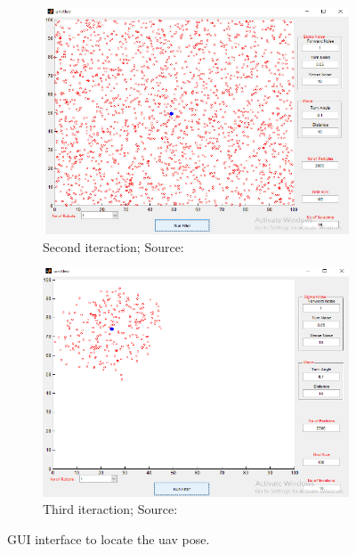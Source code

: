 \begin{figure}[H]
    \begin{subfigure}{0.49\textwidth}
        \includegraphics[width=\textwidth]{figures/gui_layout_mcl_2.png}
        \caption[Second iteraction]{Second iteraction; Source: \citet{sushant_localization_2017}}
    \end{subfigure}
    \hfill
    \begin{subfigure}{0.49\textwidth}
        \includegraphics[width=\textwidth]{figures/gui_layout_mcl_3.png}
        \caption[Third iteraction]{Third iteraction; Source: \citet{sushant_localization_2017}}
    \end{subfigure}
    \caption{GUI interface to locate the \gls*{uav} pose.}
\end{figure}